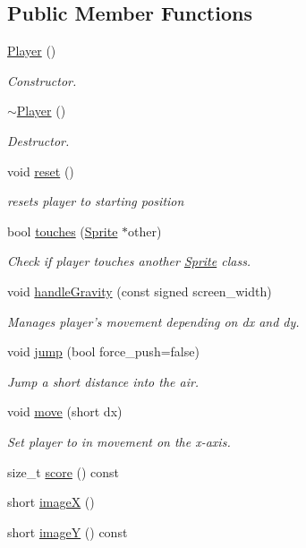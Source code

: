 \subsection*{Public Member Functions}
\begin{DoxyCompactItemize}
\item 
\hyperlink{classPlayer_affe0cc3cb714f6deb4e62f0c0d3f1fd8}{Player} ()
\begin{DoxyCompactList}\small\item\em Constructor. \end{DoxyCompactList}\item 
\hyperlink{classPlayer_a749d2c00e1fe0f5c2746f7505a58c062}{$\sim$\-Player} ()
\begin{DoxyCompactList}\small\item\em Destructor. \end{DoxyCompactList}\item 
void \hyperlink{classPlayer_a1af5d39f7bac2aeaa1e30c7dda2332fa}{reset} ()
\begin{DoxyCompactList}\small\item\em resets player to starting position \end{DoxyCompactList}\item 
bool \hyperlink{classPlayer_ab6c3ad981fd782f3b59fe19d66bc15d8}{touches} (\hyperlink{classSprite}{Sprite} $\ast$other)
\begin{DoxyCompactList}\small\item\em Check if player touches another \hyperlink{classSprite}{Sprite} class. \end{DoxyCompactList}\item 
void \hyperlink{classPlayer_ae00063df274089e1adac826d536b4e1b}{handle\-Gravity} (const signed screen\-\_\-width)
\begin{DoxyCompactList}\small\item\em Manages player's movement depending on dx and dy. \end{DoxyCompactList}\item 
void \hyperlink{classPlayer_a1304b1190f969212483e81ae85e86282}{jump} (bool force\-\_\-push=false)
\begin{DoxyCompactList}\small\item\em Jump a short distance into the air. \end{DoxyCompactList}\item 
void \hyperlink{classPlayer_ae9c07ea7f8980451fc2070bb5a76f06f}{move} (short dx)
\begin{DoxyCompactList}\small\item\em Set player to in movement on the x-\/axis. \end{DoxyCompactList}\item 
size\-\_\-t \hyperlink{classPlayer_ad14b6cfb4372d370c1dde79e51107098}{score} () const 
\item 
short \hyperlink{classPlayer_a41b677053f49c43417ce08dc4f39f62f}{image\-X} ()
\item 
short \hyperlink{classPlayer_ae25c5d5dbcbc2483a9f8a10b54416748}{image\-Y} () const 
\end{DoxyCompactItemize}
